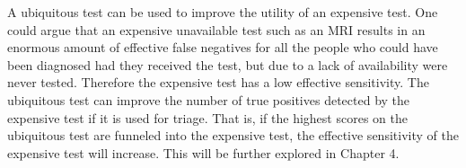 A ubiquitous test can be used to improve the utility of an expensive test.  One could argue that an expensive unavailable test such as an MRI results in an enormous amount of effective false negatives for all the people who could have been diagnosed had they received the test, but due to a lack of availability were never tested.  Therefore the expensive test has a low effective sensitivity.  The ubiquitous test can improve the number of true positives detected by the expensive test if it is used for triage.  That is, if the highest scores on the ubiquitous test are funneled into the expensive test, the effective sensitivity of the expensive test will increase.  This will be further explored in Chapter 4.



